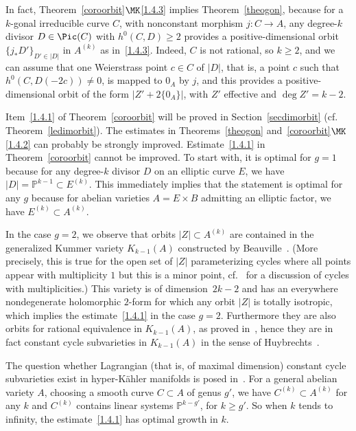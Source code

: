 In fact, Theorem~\ref{coroorbit}$\MK$\eqref{1.4.3} implies Theorem~\ref{theogon}, because for a $k$-gonal irreducible curve $C$, with nonconstant morphism $j: {C}\rightarrow A$, any degree-$k$ divisor $D\in \Pic({C})$ with $h^0({C},D)\geq 2$ provides a positive-dimensional orbit $\{j_*D'\}_{D'\in |D|}$ in $A^{(k)}$ as in~\eqref{1.4.3}. Indeed, $C$ is not rational, so $k\geq2$, and we can assume that one Weierstrass point $c\in {C}$ of $|D|$, that is, a point $c$ such that $h^0({C},D(-2c))\not=0$, is mapped to $0_A$ by $j$, and this provides a positive-dimensional orbit of the form $|Z'+2\{0_A\}|$, with $Z'$ effective and $\deg Z'= k-2$.

Item~\eqref{1.4.1} of Theorem~\ref{coroorbit} will be proved in Section~\ref{secdimorbit} (cf. Theorem~\ref{ledimorbit}). The estimates in Theorems~\ref{theogon} and~\ref{coroorbit}$\MK$\eqref{1.4.2} can probably be strongly improved. Estimate~\eqref{1.4.1} in Theorem~\ref{coroorbit} cannot be improved. To start with, it is optimal for $g=1$ because for any degree-$k$ divisor $D$ on an elliptic curve $E$, we have $|D|=\mathbb{P}^{k-1}\subset E^{(k)}$. This immediately implies that the statement is optimal for any $g$ because for abelian varieties $A=E\times B$ admitting an elliptic factor, we have $E^{(k)}\subset A^{(k)}$.

In the case $g=2$, we observe that orbits $|Z|\subset A^{(k)}$ are contained in the generalized Kummer variety $K_{k-1}(A)$ constructed by Beauville~\cite{Beau}. (More precisely, this is true for the open set of $|Z|$ parameterizing cycles where all points appear with multiplicity $1$ but this is a minor point, cf.~\cite{voisink3} for a discussion of cycles with multiplicities.) This variety is of dimension~$2k-2$ and has an everywhere nondegenerate holomorphic $2$-form for which any orbit $|Z|$ is totally isotropic, which implies the estimate~\eqref{1.4.1} in the case $g=2$. Furthermore they are also orbits for rational equivalence in $K_{k-1}(A)$, as proved in~\cite{marian}, hence they are in fact constant cycle subvarieties in $K_{k-1}(A)$ in the sense of Huybrechts~\cite{huy}.

The question whether Lagrangian (that is, of maximal dimension) constant cycle subvarieties exist in hyper-K\"ahler manifolds is posed in~\cite{voisinisot}. For a general abelian variety $A$, choosing a smooth curve $C\subset A$ of genus $g'$, we have $C^{(k)}\subset A^{(k)}$ for any $k$ and $C^{(k)}$ contains linear systems $\mathbb{P}^{k-g'}$, for $k\geq g'$. So when $k$ tends to infinity, the estimate~\eqref{1.4.1} has optimal growth in $k$.

